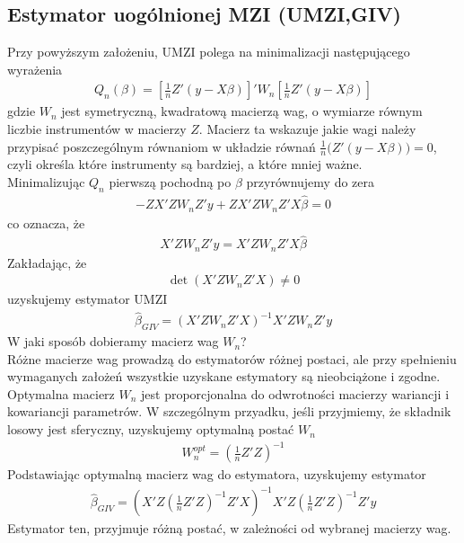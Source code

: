 \subsection{Estymator uogólnionej MZI (UMZI,GIV)}
Przy powyższym założeniu, UMZI polega na minimalizacji następującego wyrażenia
\begin{gather*}
Q_n(\beta)=
\left[\frac{1}{n}Z'\left(y-X\beta\right)\right]'
W_n
\left[\frac{1}{n}Z'\left(y-X\beta\right)\right]
\end{gather*}
gdzie $ W_n $ jest symetryczną, kwadratową macierzą wag, o wymiarze równym liczbie instrumentów w macierzy $ Z $. Macierz ta wskazuje jakie wagi należy przypisać poszczególnym równaniom w układzie równań $ \tfrac{1}{n}\bigl(Z'\left(y-X\beta\right)\bigr)=0 $, czyli określa które instrumenty są bardziej, a które mniej ważne.\\
Minimalizując $ Q_n $ pierwszą pochodną po $ \beta  $ przyrównujemy do zera
\begin{gather*}
-ZX'ZW_nZ'y+ZX'ZW_nZ'X\hat \beta =0
\end{gather*}
co oznacza, że
\begin{gather*}
X'ZW_nZ'y=X'ZW_nZ'X\hat \beta
\end{gather*}
Zakładając, że
\begin{gather*}
\det \left(X'ZW_nZ'X\right)\neq 0
\end{gather*}
uzyskujemy estymator UMZI
\begin{gather*}
\hat \beta_{GIV}=\left(X'ZW_nZ'X\right)^{-1}X'ZW_nZ'y
\end{gather*}
W jaki sposób dobieramy macierz wag $ W_n $?\\
Różne macierze wag prowadzą do estymatorów różnej postaci, ale przy spełnieniu wymaganych założeń wszystkie uzyskane estymatory są nieobciążone i zgodne. Optymalna macierz $ W_n $ jest proporcjonalna do odwrotności macierzy wariancji i kowariancji parametrów. W szczególnym przyadku, jeśli przyjmiemy, że składnik losowy jest sferyczny, uzyskujemy optymalną postać $ W_n $
\begin{gather*}
W_n^{opt}=\left(\tfrac{1}{n}Z'Z\right)^{-1}
\end{gather*}
Podstawiając optymalną macierz wag do estymatora, uzyskujemy estymator
\begin{gather*}
\hat \beta_{GIV}=\left(X'Z\left(\tfrac{1}{n}Z'Z\right)^{-1}Z'X\right)^{-1}X'Z\left(\tfrac{1}{n}Z'Z\right)^{-1}Z'y
\end{gather*}
Estymator ten, przyjmuje różną postać, w zależności od wybranej macierzy wag.
